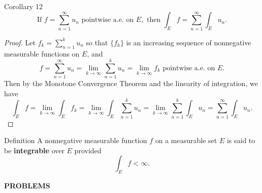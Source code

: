 \begin{flushleft}
\begin{namedthm*}{Corollary 12}
        \[
            \text{If }f=\sum_{n=1}^\infty u_n\text{ pointwise a.e. on }E,\text{ then }\int_Ef=\sum_{n=1}^\infty\int_Eu_n.
        \]
    \end{namedthm*}
    \begin{proof}
        Let $f_k=\sum_{n=1}^ku_n$ so that $\{f_k\}$ is an increasing sequence of nonnegative measurable functions on $E$, and
        \[
            f=\sum_{n=1}^\infty u_n=\lim_{k\to\infty}\sum_{n=1}^ku_n=\lim_{k\to\infty}f_k\text{ pointwise a.e. on }E.
        \]
        Then by the Monotone Convergence Theorem and the linearity of integration, we have
        \[
            \int_Ef=\lim_{k\to\infty}\int_Ef_k=\lim_{k\to\infty}\int_E\sum_{n=1}^ku_n=\lim_{k\to\infty}\sum_{n=1}^k\int_Eu_n=\sum_{n=1}^\infty\int_Eu_n.
        \]
    \end{proof}
    \begin{namedthm*}{Definition}
        A nonnegative measurable function $f$ on a measurable set $E$ is said to be \textbf{integrable} over $E$ provided
        \[
            \int_Ef<\infty.    
        \]
    \end{namedthm*}
\end{flushleft}
\begin{center}
	\textbf{PROBLEMS}
\end{center}

